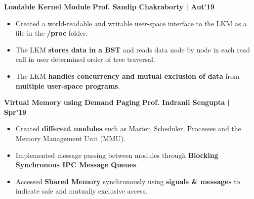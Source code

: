 \documentclass[10pt]{article}
\begin{document}
\begin{itemize}[leftmargin=*]
\end{itemize}

{\color{headliner} \spacedhrule{0.15ex}{1.0ex}}
\large {\textbf{Loadable Kernel Module}} \normalsize \href{https://github.com/shmundhra/Systems-Programming/blob/master/LKM/LKM_BST.pdf} {\hspace{0.5ex}\faGithub} {\hfill} \textbf{Prof. Sandip Chakraborty | Aut'19}\\[-1.75em]
\begin{itemize}
    \item Created a world-readable and writable user-space interface to the LKM as a file in the \textbf{/proc} folder. \\[-1.9em]
    \item The LKM \textbf{stores data in a BST} and reads data node by node in each read call in user determined order of tree traversal. \\[-1.9em]
    \item The LKM \textbf{handles concurrency and mutual exclusion of data} from \textbf{multiple user-space programs}.\\[-1em]
\end{itemize}
\vspace{-0.5ex}
\large {\textbf{Virtual Memory using Demand Paging}} \normalsize  \href{https://github.com/shmundhra/Systems-Programming/tree/master/Demand_Paging} {\hspace{0.5ex}\faGithub} {\hfill} \textbf{Prof. Indranil Sengupta | Spr'19}\\[-1.75em]
\begin{itemize}
    \item Created \textbf{different modules} such as Master, Scheduler, Processes and the Memory Management Unit (MMU).\\[-1.9em]
    \item Implemented message passing between modules through     \textbf{Blocking Synchronous IPC Message Queues}.\\[-1.9em]
    \item Accessed \textbf{Shared Memory} synchronously using \textbf{signals \& messages} to indicate safe and mutually exclusive access.
    \\[-1em]
\end{itemize}
\end{document}

